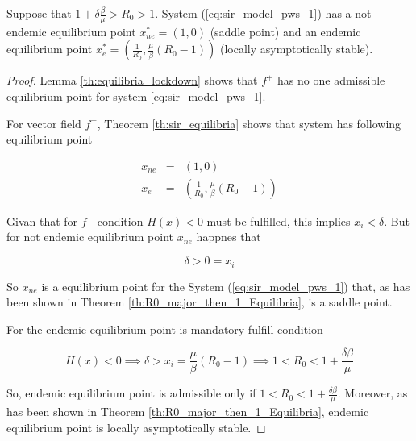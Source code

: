 \begin{theorem}
Suppose that $ 1+\delta\frac{\beta}{\mu} > R_0 > 1$. System (\ref{eq:sir_model_pws_1}) has a not endemic equilibrium point $x_{ne}^*=(1,0)$ (saddle point) and an endemic equilibrium point $x_{e}^*=\left(\frac{1}{R_0}, \frac{\mu}{\beta}\left(R_0 - 1\right)\right)$ (locally asymptotically stable).
\end{theorem}

\begin{proof}
Lemma \ref{th:equilibria_lockdown} shows that $f^+$ has no one admissible equilibrium point for system \ref{eq:sir_model_pws_1}.

For vector field $f^-$, Theorem \ref{th:sir_equilibria} shows that system has following equilibrium point

\begin{equation}
    \begin{array}{ccc}
    x_{ne} &=& (1,0) \\
    x_{e} &=& \left(\frac{1}{R_0}, \frac{\mu}{\beta}\left(R_0 - 1\right)\right)
    \end{array}
\end{equation}

Givan that for $f^-$ condition $H(x) < 0$ must be fulfilled, this implies $x_i < \delta$. But for not endemic equilibrium point $x_{ne}$ happnes that

\begin{equation}
    \delta > 0 = x_i
\end{equation}

So $x_{ne}$ is a equilibrium point for the System (\ref{eq:sir_model_pws_1}) that, as has been shown in Theorem \ref{th:R0_major_then_1_Equilibria}, is a saddle point.

For the endemic equilibrium point is mandatory fulfill condition

\begin{equation}
    H(x) < 0 \implies \delta > x_i = \frac{\mu}{\beta}\left(R_0 - 1\right) \implies 1 < R_0 < 1 + \frac{\delta\beta}{\mu}
\end{equation}

So, endemic equilibrium point is admissible only if $1 < R_0 < 1 + \frac{\delta\beta}{\mu}$. Moreover, as has been shown in Theorem \ref{th:R0_major_then_1_Equilibria}, endemic equilibrium point is locally asymptotically stable.
\end{proof}